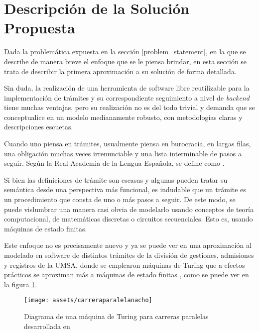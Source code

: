 \section{Descripción de la Solución Propuesta}
Dada la problemática expuesta en la sección \ref{problem_statement}, en la que
se describe de manera breve el enfoque que se le piensa brindar, en esta sección
se trata de describir la primera aproximación a su solución de forma detallada.

Sin duda, la realización de una herramienta de software libre reutilizable para
la implementación de trámites y su correspondiente seguimiento a nivel de
\textit{backend} tiene muchas ventajas, pero su realización no es del todo trivial y
demanda que se conceptualice en un modelo medianamente robusto, con metodologías
claras y descripciones escuetas.

Cuando uno piensa en trámites, usualmente piensa en burocracia, en largas filas,
una obligación muchas veces irrenunciable y una lista interminable de pasos a
seguir. Según la Real Academia de la Lengua Española, se define como  \parencite{asaleDiccionarioLenguaEspanola}.

Si bien las definiciones de trámite son escasas y algunas pueden tratar su
semántica desde una perspectiva más funcional, es indudable que un trámite es un
procedimiento que consta de uno o más pasos a seguir. De este modo, se puede
vislumbrar una manera casi obvia de modelarlo usando conceptos de teoría
computacional, de matemáticas discretas o circuitos secuenciales. Esto es,
usando máquinas de estado finitas.

Este enfoque no es precisamente nuevo y ya se puede ver en una aproximación al
modelado en software de distintos trámites de la división de gestiones,
admisiones y registros de la UMSA, donde se emplearon máquinas de Turing que a
efectos prácticos se aproximan más a máquinas de estado finitas
\parencite{nachoSISTEMACONTROLTRAMITES2007}, como se puede ver en la figura
\ref{fig:nachocarreraparalela}.

\begin{figure}
    \centering
    \texttt{[image: assets/carreraparalelanacho]}
    \caption{Diagrama de una máquina de Turing para carreras paralelas
        desarrollada en \cite{nachoSISTEMACONTROLTRAMITES2007}}
    \label{fig:nachocarreraparalela}
\end{figure}

